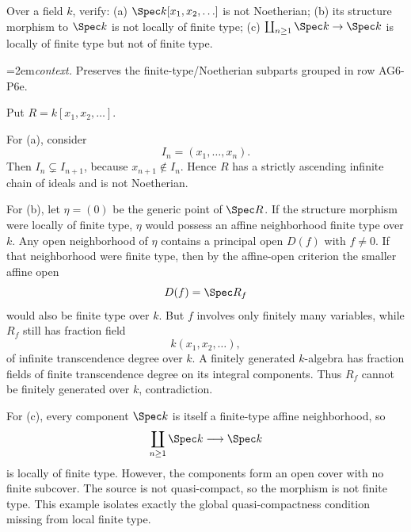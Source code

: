 \begin{problem}\label{prob:vi26-p03}
Over a field \(k\), verify: (a) \(\Spec k[x_1,x_2,\ldots]\) is not Noetherian; (b) its structure morphism to \(\Spec k\) is not locally of finite type; (c) \(\coprod_{n\ge1}\Spec k\to\Spec k\) is locally of finite type but not of finite type.
\par\smallskip\begingroup\emergencystretch=2em\noindent\textit{context.} Preserves the finite-type/\allowbreak Noetherian subparts grouped in row AG6-P6e.\par\endgroup
\end{problem}

\ifdefined\FullProblemDossiers
\begin{solution}
Put \(R=k[x_1,x_2,\ldots]\).

For (a), consider
\[
I_n=(x_1,\ldots,x_n).
\]
Then \(I_n\subsetneq I_{n+1}\), because \(x_{n+1}\notin I_n\).  Hence \(R\) has a strictly
ascending infinite chain of ideals and is not Noetherian.

For (b), let \(\eta=(0)\) be the generic point of \(\Spec R\).  If the structure morphism were
locally of finite type, \(\eta\) would possess an affine neighborhood finite type over \(k\).
Any open neighborhood of \(\eta\) contains a principal open \(D(f)\) with \(f\ne0\).  If that
neighborhood were finite type, then by the affine-open criterion the smaller affine open
\[
D(f)=\Spec R_f
\]
would also be finite type over \(k\).  But \(f\) involves only finitely many variables, while
\(R_f\) still has fraction field
\[
k(x_1,x_2,\ldots),
\]
of infinite transcendence degree over \(k\).  A finitely generated \(k\)-algebra has fraction fields
of finite transcendence degree on its integral components.  Thus \(R_f\) cannot be finitely
generated over \(k\), contradiction.

For (c), every component \(\Spec k\) is itself a finite-type affine neighborhood, so
\[
\coprod_{n\ge1}\Spec k\longrightarrow\Spec k
\]
is locally of finite type.  However, the components form an open cover with no finite subcover.
The source is not quasi-compact, so the morphism is not finite type.  This example isolates exactly
the global quasi-compactness condition missing from local finite type.
\end{solution}
\fi
